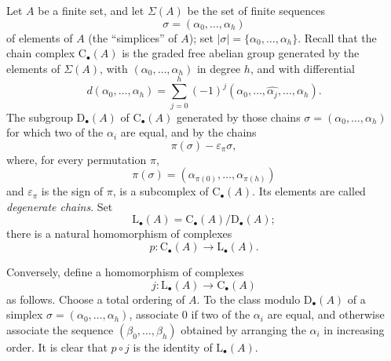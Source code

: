 \begin{env}[11.8.1]
\label{0.11.8.1}
Let $A$ be a finite set, and let $\Sigma(A)$ be the set of finite
sequences
\[
  \sigma=(\alpha_0,\ldots,\alpha_h)
\]
of elements of $A$ (the ``simplices'' of $A$); set
$|\sigma|=\{\alpha_0,\ldots,\alpha_h\}$.
Recall that the chain complex $\mathrm{C}_\bullet(A)$ is the graded free
abelian group generated by the elements of $\Sigma(A)$, with
$(\alpha_0,\ldots,\alpha_h)$ in degree $h$, and with differential
\[
  d(\alpha_0,\ldots,\alpha_h)
  =
  \sum_{j=0}^{h}(-1)^j
  (\alpha_0,\ldots,\widehat{\alpha_j},\ldots,\alpha_h).
\]
The subgroup $\mathrm{D}_\bullet(A)$ of $\mathrm{C}_\bullet(A)$ generated
by those chains $\sigma=(\alpha_0,\ldots,\alpha_h)$ for which two of the
$\alpha_i$ are equal, and by the chains
\[
  \pi(\sigma)-\varepsilon_\pi\sigma,
\]
where, for every permutation $\pi$,
\[
  \pi(\sigma)
  =
  (\alpha_{\pi(0)},\ldots,\alpha_{\pi(h)})
\]
and $\varepsilon_\pi$ is the sign of $\pi$, is a subcomplex of
$\mathrm{C}_\bullet(A)$.
Its elements are called \emph{degenerate chains}.
Set
\[
  \mathrm{L}_\bullet(A)
  =
  \mathrm{C}_\bullet(A)/\mathrm{D}_\bullet(A);
\]
there is a natural homomorphism of complexes
\[
  p:\mathrm{C}_\bullet(A)\longrightarrow\mathrm{L}_\bullet(A).
\]

Conversely, define a homomorphism of complexes
\[
  j:\mathrm{L}_\bullet(A)\longrightarrow\mathrm{C}_\bullet(A)
\]
as follows.
Choose a total ordering of $A$.
To the class modulo $\mathrm{D}_\bullet(A)$ of a simplex
$\sigma=(\alpha_0,\ldots,\alpha_h)$, associate $0$ if two of the
$\alpha_i$ are equal, and otherwise associate the sequence
$(\beta_0,\ldots,\beta_h)$ obtained by arranging the $\alpha_i$ in
increasing order.
It is clear that $p\circ j$ is the identity of
$\mathrm{L}_\bullet(A)$.
\end{env}

